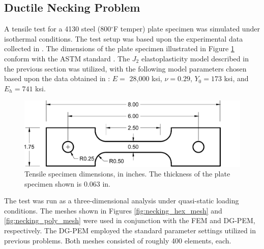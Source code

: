 \subsection*{Ductile Necking Problem}

A tensile test for a 4130 steel (800$^\circ$F temper) plate specimen was simulated under isothermal conditions. The test setup was based upon the experimental data collected in \cite{Gerberich:62}. The dimensions of the plate specimen illustrated in Figure \ref{fig:tensile_specimen_dimensions} conform with the ASTM standard \cite{ASTM:08}. The $J_2$ elastoplasticity model described in the previous section was utilized, with the following model parameters chosen based upon the data obtained in \cite{Gerberich:62}: $E =$ 28,000 ksi, $\nu = 0.29$, $Y_0 = 173$ ksi, and $E_h = 741$ ksi.

\begin{figure}[!h]
  \centering
  \includegraphics[width=6.0in]{figures/tensile_specimen_dimensions.pdf}
  \caption{Tensile specimen dimensions, in inches. The thickness of the plate specimen shown is $0.063$ in.}
  \label{fig:tensile_specimen_dimensions}
\end{figure}

The test was run as a three-dimensional analysis under quasi-static loading conditions. The meshes shown in Figures \ref{fig:necking_hex_mesh} and \ref{fig:necking_poly_mesh} were used in conjunction with the FEM and DG-PEM, respectively. The DG-PEM employed the standard parameter settings utilized in previous problems. Both meshes consisted of roughly 400 elements, each.

